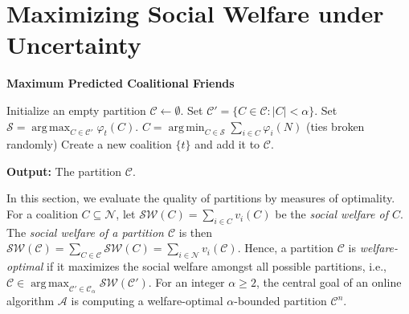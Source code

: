 \documentclass[letterpaper]{article} %
\DeclareMathOperator*{\argmax}{arg\,max}
\DeclareMathOperator*{\argmin}{arg\,min}
\begin{document}
\section{Maximizing Social Welfare under Uncertainty}
\label{sec:Maximizing Welfare using Predictions}

\begin{algorithm}[tb]
    \caption{\textbf{Maximum Predicted Coalitional Friends}}
    \label{alg:MPCF}    
    \begin{algorithmic}[1] %
        \STATE Initialize an empty partition $\mathcal{C} \leftarrow \emptyset$.
            \STATE Set $\mathcal{C}' = \{C \in \mathcal{C}: |C| < \alpha\}$.
                \STATE Set $\mathcal{S} = \argmax_{C \in \mathcal{C}'} \varphi_t(C)$.
                \STATE $C = \argmin_{C \in \mathcal{S}} \sum_{i \in C} \varphi_i(N)$ (ties broken randomly)
            \ELSE 
                \STATE Create a new coalition $\{t\}$ and add it to $\mathcal{C}$.
            \ENDIF
        \ENDWHILE
    \end{algorithmic}
    \textbf{Output:} The partition $\mathcal{C}$.
\end{algorithm}

In this section, we evaluate the quality of partitions by measures of optimality. For a coalition $C \subseteq \mathcal{N}$, let $\mathcal{SW}(C) = \sum_{i \in C} v_i(C)$ be the \textit{social welfare of $C$}. The \textit{social welfare of a partition $\mathcal{C}$} is then $\mathcal{SW}(\mathcal{C}) = \sum_{C \in \mathcal{C}} \mathcal{SW}(C) = \sum_{i \in \mathcal{N}} v_i(\mathcal{C})$. Hence, a partition $\mathcal{C}$ is \textit{welfare-optimal} if it maximizes the social welfare amongst all possible partitions, i.e., $\mathcal{C} \in \argmax_{\mathcal{C}' \in \mathscr{C}_\alpha} \mathcal{SW}(\mathcal{C}')$. For an integer $\alpha \geq 2$, the central goal of an online algorithm $\mathcal{A}$ is computing a welfare-optimal $\alpha$-bounded partition $\mathcal{C}^n$. 
%

%
\end{document}
